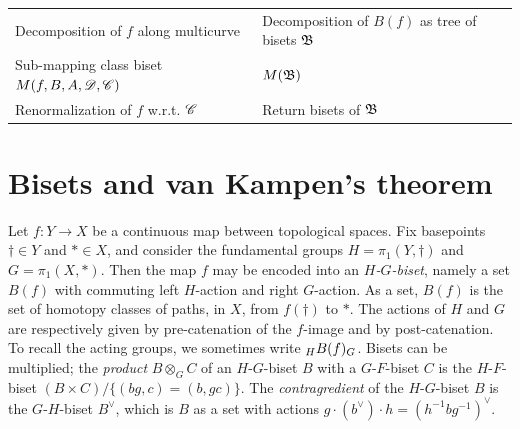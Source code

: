 \documentclass{amsart}
\begin{document}
\begin{tabular}{l|l}
  Decomposition of $f$ along multicurve & Decomposition of $B(f)$ as tree of bisets ${\mathfrak B}$\\
  Sub-mapping class biset $M(f,B,A,{\mathscr D},{\mathscr C})$ & $M({\mathfrak B})$\\
  Renormalization of $f$ w.r.t. ${\mathscr C}$ & Return bisets of ${\mathfrak B}$
\end{tabular}

\renewcommand\thesection{\Roman{section}}
\section{Bisets and van Kampen's theorem~\cite{bartholdi-dudko:bc1}}\label{ss:bisets}
Let $f\colon Y\to X$ be a continuous map between topological
spaces. Fix basepoints $\dagger\in Y$ and $*\in X$, and consider the
fundamental groups $H=\pi_1(Y,\dagger)$ and $G=\pi_1(X,*)$. Then the
map $f$ may be encoded into an \emph{$H$-$G$-biset}, namely a set
$B(f)$ with commuting left $H$-action and right $G$-action. As a set,
$B(f)$ is the set of homotopy classes of paths, in $X$, from
$f(\dagger)$ to $*$. The actions of $H$ and $G$ are respectively given
by pre-catenation of the $f$-image and by post-catenation. To recall
the acting groups, we sometimes write $\subscript H B(f)_G$. Bisets
can be multiplied; the \emph{product} $B\otimes_G C$ of an
$H$-$G$-biset $B$ with a $G$-$F$-biset $C$ is the $H$-$F$-biset
$(B\times C)/\{(b g,c)=(b,g c)\}$. The \emph{contragredient} of the
$H$-$G$-biset $B$ is the $G$-$H$-biset $B^\vee$, which is $B$ as a set
with actions $g\cdot(b^\vee)\cdot h=(h^{-1}b g^{-1})^\vee$.
\end{document}
